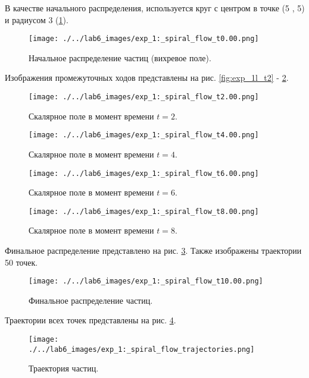 В качестве начального распределения, используется круг с центром в точке (5 , 5) и радиусом 3 (\ref{fig:lg_vortex_begin}).
\begin{figure}
	\centering
	\texttt{[image: ./../lab6\_images/exp\_1:\_spiral\_flow\_t0.00.png]}
	\caption{Начальное распределение частиц (вихревое поле).}
	\label{fig:lg_vortex_begin}
\end{figure}

Изображения промежуточных ходов представлены на рис. \ref{fig:exp_1l_t2} - \ref{fig:exp_1l_t8}.

\begin{figure}
	\centering
	\begin{minipage}[b]{0.48\textwidth}
		\centering
		\texttt{[image: ./../lab6\_images/exp\_1:\_spiral\_flow\_t2.00.png]}
		\caption{Скалярное поле в момент времени $t=2$.}
		\label{fig:exp_1l_t2}
	\end{minipage}
	\hfill
	\begin{minipage}[b]{0.48\textwidth}
		\centering
		\texttt{[image: ./../lab6\_images/exp\_1:\_spiral\_flow\_t4.00.png]}
		\caption{Скалярное поле в момент времени $t=4$.}
	\end{minipage}
	\vspace{0.5cm}
	
	\begin{minipage}[b]{0.48\textwidth}
		\centering
		\texttt{[image: ./../lab6\_images/exp\_1:\_spiral\_flow\_t6.00.png]}
		\caption{Скалярное поле в момент времени $t=6$.}
	\end{minipage}
	\hfill
	\begin{minipage}[b]{0.48\textwidth}
		\centering
		\texttt{[image: ./../lab6\_images/exp\_1:\_spiral\_flow\_t8.00.png]}
		\caption{Скалярное поле в момент времени $t=8$.}
		\label{fig:exp_1l_t8}
	\end{minipage}
\end{figure}

\newpage
Финальное распределение представлено на рис. \ref{fig:lg_vortex_finall}. Также изображены траектории 50 точек.
\begin{figure}
	\centering
	\texttt{[image: ./../lab6\_images/exp\_1:\_spiral\_flow\_t10.00.png]}
	\caption{Финальное распределение частиц.}
	\label{fig:lg_vortex_finall}
\end{figure}

Траектории всех точек представлены на рис. \ref{fig:lg_vortex_tr}. 

\begin{figure}[H]
	\centering
	\texttt{[image: ./../lab6\_images/exp\_1:\_spiral\_flow\_trajectories.png]}
	\caption{Траектория частиц.}
	\label{fig:lg_vortex_tr}
\end{figure}


